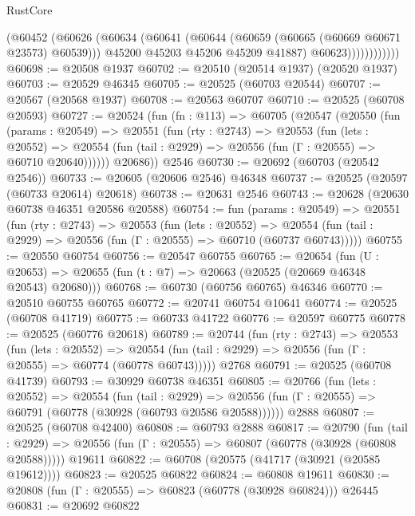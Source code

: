 \begin{lexlean}{RustCore}
\begin{coremodule}
                      (@60452
                        (@60626
                          (@60634
                            (@60641
                              (@60644 (@60659 (@60665 (@60669 @60671 @23573) @60539)))
                              @45200
                              @45203
                              @45206
                              @45209
                              @41887)
                            @60623))))))))))))
@60698 := @20508 @1937
@60702 := @20510 (@20514 @1937) (@20520 @1937)
@60703 := @20529 @46345
@60705 := @20525 (@60703 @20544)
@60707 := @20567 (@20568 @1937)
@60708 := @20563 @60707
@60710 := @20525 (@60708 @20593)
@60727 := @20524
    (fun (fn : @113) =>
    @60705
      (@20547
        (@20550
          (fun (params : @20549) =>
          @20551
            (fun (rty : @2743) =>
            @20553
              (fun (lets : @20552) =>
              @20554 (fun (tail : @2929) => @20556 (fun (Γ : @20555) => @60710 @20640))))))
        @20686))
    @2546
@60730 := @20692 (@60703 (@20542 @2546))
@60733 := @20605 (@20606 @2546) @46348
@60737 := @20525 (@20597 (@60733 @20614) @20618)
@60738 := @20631 @2546
@60743 := @20628 (@20630 @60738 @46351 @20586 @20588)
@60754 := fun (params : @20549) =>
  @20551
    (fun (rty : @2743) =>
    @20553
      (fun (lets : @20552) =>
      @20554 (fun (tail : @2929) => @20556 (fun (Γ : @20555) => @60710 (@60737 @60743)))))
@60755 := @20550 @60754
@60756 := @20547 @60755
@60765 := @20654
    (fun (U : @20653) => @20655 (fun (t : @7) => @20663 (@20525 (@20669 @46348 @20543) @20680)))
@60768 := @60730 (@60756 @60765) @46346
@60770 := @20510 @60755 @60765
@60772 := @20741 @60754 @10641
@60774 := @20525 (@60708 @41719)
@60775 := @60733 @41722
@60776 := @20597 @60775
@60778 := @20525 (@60776 @20618)
@60789 := @20744
    (fun (rty : @2743) =>
    @20553
      (fun (lets : @20552) =>
      @20554 (fun (tail : @2929) => @20556 (fun (Γ : @20555) => @60774 (@60778 @60743)))))
    @2768
@60791 := @20525 (@60708 @41739)
@60793 := @30929 @60738 @46351
@60805 := @20766
    (fun (lets : @20552) =>
    @20554
      (fun (tail : @2929) =>
      @20556 (fun (Γ : @20555) => @60791 (@60778 (@30928 (@60793 @20586 @20588))))))
    @2888
@60807 := @20525 (@60708 @42400)
@60808 := @60793 @2888
@60817 := @20790
    (fun (tail : @2929) => @20556 (fun (Γ : @20555) => @60807 (@60778 (@30928 (@60808 @20588)))))
    @19611
@60822 := @60708 (@20575 (@41717 (@30921 (@20585 @19612))))
@60823 := @20525 @60822
@60824 := @60808 @19611
@60830 := @20808 (fun (Γ : @20555) => @60823 (@60778 (@30928 @60824))) @26445
@60831 := @20692 @60822

\end{coremodule}
\end{lexlean}
